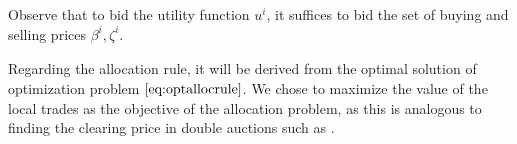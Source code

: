 \documentclass[runningheads]{llncs}
\newcommand{\oi}[1][]{n^i_{#1}}
\newcommand{\ci}[1][]{C^i_{#1}}
\newcommand{\pbi}[1][]{\beta^i_{#1}}
\newcommand{\pzi}[1][]{\zeta^i_{#1}}
\newcommand{\fsi}{\mathcal{F}^i}
\newcommand{\pri}[1][]{\lambda^i_{#1}}
\newcommand{\gaini}[1][]{\mathcal{P}^i_{#1}}
\newcommand{\uti}{u^i}
\begin{document}
Observe that to bid the utility function $\uti$, it suffices to bid the set of buying and selling prices $\pbi, \pzi$.


Regarding the allocation rule, it will be derived from the optimal solution of optimization problem $\eqref{eq:optallocrule}$.
We chose to maximize the value of the local trades as the objective of the allocation problem, as this is analogous to finding the clearing price in double auctions such as \cite{huang2002design}.
\end{document}
